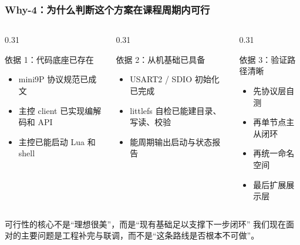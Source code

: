 \documentclass[aspectratio=169]{ctexbeamer}
\begin{document}
\begin{frame}
  \frametitle{Why-4：为什么判断这个方案在课程周期内可行}
  \begin{columns}[T]
    \begin{column}{0.31\textwidth}
      \begin{block}{依据 1：代码底座已存在}
        \small
        \begin{itemize}
          \item mini9P 协议规范已成文
          \item 主控 client 已实现编解码和 API
          \item 主控已能启动 Lua 和 shell
        \end{itemize}
      \end{block}
    \end{column}
    \begin{column}{0.31\textwidth}
      \begin{block}{依据 2：从机基础已具备}
        \small
        \begin{itemize}
          \item USART2 / SDIO 初始化已完成
          \item littlefs 自检已能建目录、写读、校验
          \item 能周期输出启动与状态报告
        \end{itemize}
      \end{block}
    \end{column}
    \begin{column}{0.31\textwidth}
      \begin{block}{依据 3：验证路径清晰}
        \small
        \begin{itemize}
          \item 先协议层自测
          \item 再单节点主从闭环
          \item 再统一命名空间
          \item 最后扩展展示层
        \end{itemize}
      \end{block}
    \end{column}
  \end{columns}
  \vspace{0.2cm}
  \begin{alertblock}{可行性的核心不是“理想很美”，而是“现有基础足以支撑下一步闭环”}
    \small
    我们现在面对的主要问题是\alert{工程补完与联调}，而不是“这条路线是否根本不可做”。
  \end{alertblock}
\end{frame}
\end{document}
